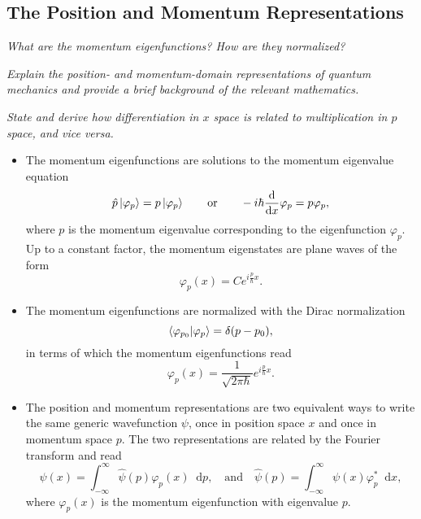 \documentclass[11pt, a4paper]{article}
\newcommand{\diff}{\mathop{}\!\mathrm{d}} %
\newcommand{\F}[1]{\widehat{#1}} %
\begin{document}
\subsection{The Position and Momentum Representations}
\textit{What are the momentum eigenfunctions? How are they normalized?}

\vspace{2mm}

\textit{Explain the position- and momentum-domain representations of quantum mechanics and provide a brief background of the relevant mathematics.}

\vspace{2mm}
\textit{State and derive how differentiation in $ x $ space is related to multiplication in $ p $ space, and vice versa.}

\begin{itemize}

    \item The momentum eigenfunctions are solutions to the momentum eigenvalue equation
    \begin{equation*}
        \hat{p} \ket{\varphi_{p}} = p \ket{\varphi_{p}} \qquad \text{or} \qquad -i \hbar \dv{x} \varphi_{p} = p \varphi_{p},
    \end{equation*}
    where $ p $ is the momentum eigenvalue corresponding to the eigenfunction $ \varphi_{p} $. Up to a constant factor, the momentum eigenstates are plane waves of the form
    \begin{equation*}
        \varphi_{p}(x) = C e^{i \frac{p}{\hbar}x}.
    \end{equation*}
    
    \item The momentum eigenfunctions are normalized with the Dirac normalization
    \begin{equation*}
       \braket{\varphi_{p_{0}}}{\varphi_{p}} = \delta(p - p_{0}),
    \end{equation*}
    in terms of which the momentum eigenfunctions read
    \begin{equation*}
        \varphi_{p}(x) = \frac{1}{\sqrt{2\pi \hbar}} e^{i \frac{p}{\hbar}x}.
    \end{equation*}

    \item The position and momentum representations are two equivalent ways to write the same generic wavefunction $ \psi $, once in position space $ x $ and once in momentum space $ p $. The two representations are related by the Fourier transform and read
    \begin{equation*}
        \psi(x) = \int_{-\infty}^{\infty}\F{\psi}(p)\varphi_{p}(x)\diff p, \quad \text{and} \quad \F{\psi}(p) = \int_{-\infty}^{\infty}\psi(x)\varphi_{p}^{*} \diff x,
    \end{equation*}
    where $ \varphi_{p}(x) $ is the momentum eigenfunction with eigenvalue $ p $.


\end{itemize}
\end{document}
